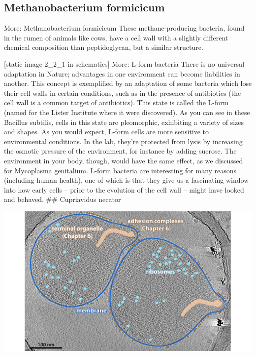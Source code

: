 \documentclass[]{tufte-book}
\begin{document}
\subsection{Methanobacterium
formicicum}\label{methanobacterium-formicicum}

More: Methanobacterium formicicum These methane-producing bacteria,
found in the rumen of animals like cows, have a cell wall with a
slightly different chemical composition than peptidoglycan, but a
similar structure.

{[}static image 2\_2\_1 in schematics{]} More: L-form bacteria There is
no universal adaptation in Nature; advantages in one environment can
become liabilities in another. This concept is exemplified by an
adaptation of some bacteria which lose their cell walls in certain
conditions, such as in the presence of antibiotics (the cell wall is a
common target of antibiotics). This state is called the L-form (named
for the Lister Institute where it were discovered). As you can see in
these Bacillus subtilis, cells in this state are pleomorphic, exhibiting
a variety of sizes and shapes. As you would expect, L-form cells are
more sensitive to environmental conditions. In the lab, they're
protected from lysis by increasing the osmotic pressure of the
environment, for instance by adding sucrose. The environment in your
body, though, would have the same effect, as we discussed for Mycoplasma
genitalium. L-form bacteria are interesting for many reasons (including
human health), one of which is that they give us a fascinating window
into how early cells -- prior to the evolution of the cell wall -- might
have looked and behaved. \#\# Cupriavidus necator

\includegraphics{img/02_static/2_1_Mgenitalium}
\end{document}
